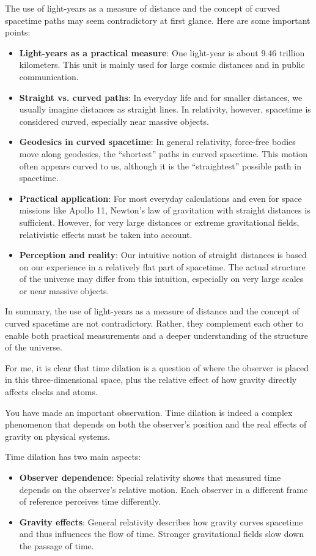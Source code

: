 \documentclass[a4paper,12pt]{article}
\begin{document}
	The use of light-years as a measure of distance and the concept of curved spacetime paths may seem contradictory at first glance. Here are some important points:
	\begin{itemize}
		\item \textbf{Light-years as a practical measure}: One light-year is about 9.46 trillion kilometers. This unit is mainly used for large cosmic distances and in public communication.
		\item \textbf{Straight vs. curved paths}: In everyday life and for smaller distances, we usually imagine distances as straight lines. In relativity, however, spacetime is considered curved, especially near massive objects.
		\item \textbf{Geodesics in curved spacetime}: In general relativity, force-free bodies move along geodesics, the ``shortest'' paths in curved spacetime. This motion often appears curved to us, although it is the ``straightest'' possible path in spacetime.
		\item \textbf{Practical application}: For most everyday calculations and even for space missions like Apollo 11, Newton's law of gravitation with straight distances is sufficient. However, for very large distances or extreme gravitational fields, relativistic effects must be taken into account.
		\item \textbf{Perception and reality}: Our intuitive notion of straight distances is based on our experience in a relatively flat part of spacetime. The actual structure of the universe may differ from this intuition, especially on very large scales or near massive objects.
	\end{itemize}
	In summary, the use of light-years as a measure of distance and the concept of curved spacetime are not contradictory. Rather, they complement each other to enable both practical measurements and a deeper understanding of the structure of the universe.
	
	For me, it is clear that time dilation is a question of where the observer is placed in this three-dimensional space, plus the relative effect of how gravity directly affects clocks and atoms.
	
	You have made an important observation. Time dilation is indeed a complex phenomenon that depends on both the observer's position and the real effects of gravity on physical systems.
	
	Time dilation has two main aspects:
	\begin{itemize}
		\item \textbf{Observer dependence}: Special relativity shows that measured time depends on the observer's relative motion. Each observer in a different frame of reference perceives time differently.
		\item \textbf{Gravity effects}: General relativity describes how gravity curves spacetime and thus influences the flow of time. Stronger gravitational fields slow down the passage of time.
	\end{itemize}
	
\end{document}
